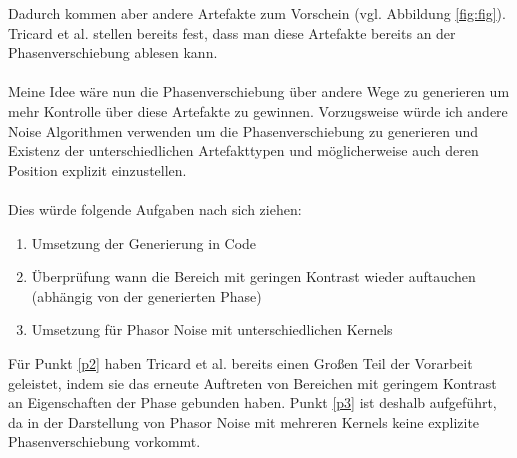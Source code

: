 \documentclass[a4paper]{scrartcl}
\begin{document}
Dadurch kommen aber andere Artefakte zum Vorschein (vgl. Abbildung \ref{fig:fig}). Tricard et al. stellen bereits fest, dass man diese Artefakte bereits an der Phasenverschiebung ablesen kann.\\
\\
Meine Idee wäre nun die Phasenverschiebung über andere Wege zu generieren um mehr Kontrolle über diese Artefakte zu gewinnen. Vorzugsweise würde ich andere Noise Algorithmen verwenden um die Phasenverschiebung zu generieren und Existenz der unterschiedlichen Artefakttypen und möglicherweise auch deren Position explizit einzustellen.\\
\\
Dies würde folgende Aufgaben nach sich ziehen:
\begin{enumerate}
\item Umsetzung der Generierung in Code
\item Überprüfung wann die Bereich mit geringen Kontrast wieder auftauchen (abhängig von der generierten Phase)\label{p2}
\item Umsetzung für Phasor Noise mit unterschiedlichen Kernels\label{p3}
\end{enumerate}
Für Punkt \ref{p2} haben Tricard et al. bereits einen Großen Teil der Vorarbeit geleistet, indem sie das erneute Auftreten von Bereichen mit geringem Kontrast an Eigenschaften der Phase gebunden haben. Punkt \ref{p3} ist deshalb aufgeführt, da in der Darstellung von Phasor Noise mit mehreren Kernels keine explizite Phasenverschiebung vorkommt.


{}

\end{document}
